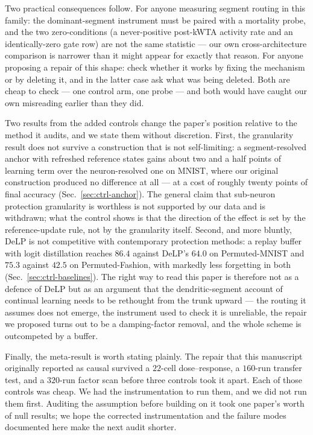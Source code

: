 \documentclass[review,12pt,number]{elsarticle}
\begin{document}
Two practical consequences follow. For anyone measuring segment routing in
this family: the dominant-segment instrument must be paired with a mortality
probe, and the two zero-conditions (a never-positive post-kWTA activity rate
and an identically-zero gate row) are not the same statistic --- our own
cross-architecture comparison is narrower than it might appear for exactly
that reason. For anyone proposing a repair of this shape: check whether it
works by fixing the mechanism or by deleting it, and in the latter case ask
what was being deleted. Both are cheap to check --- one control arm, one
probe --- and both would have caught our own misreading earlier than they
did.

Two results from the added controls change the paper's
position relative to the method it audits, and we state them without
discretion. First, the granularity result does not survive a
construction that is not self-limiting: a segment-resolved anchor with
refreshed reference states gains about two and a half points of learning term over
the neuron-resolved one on MNIST, where our original construction
produced no difference at all --- at a cost of roughly twenty points of
final accuracy (Sec.~\ref{sec:ctrl-anchor}). The general claim that
sub-neuron protection granularity is worthless is not supported by our
data and is withdrawn; what the control shows is that the direction of
the effect is set by the reference-update rule, not by the granularity
itself. Second, and more bluntly, DeLP is not competitive with
contemporary protection methods: a replay buffer with logit distillation
reaches $86.4$ against DeLP's $64.0$ on Permuted-MNIST and $75.3$
against $42.5$ on Permuted-Fashion, with markedly less forgetting in
both (Sec.~\ref{sec:ctrl-baselines}). The right way to read this paper is
therefore not as a defence of DeLP but as an argument that the
dendritic-segment account of continual learning needs to be rethought
from the trunk upward --- the routing it assumes does not emerge, the
instrument used to check it is unreliable, the repair we proposed turns
out to be a damping-factor removal, and the whole scheme is outcompeted
by a buffer.

Finally, the meta-result is worth stating plainly. The repair that this
manuscript originally reported as causal survived a $22$-cell
dose--response, a $160$-run transfer test, and a $320$-run factor scan
before three controls took it apart. Each of those controls was cheap. We
had the instrumentation to run them, and we did not run them first. Auditing
the assumption before building on it took one paper's worth of null results;
we hope the corrected instrumentation and the failure modes documented here
make the next audit shorter.
\end{document}
